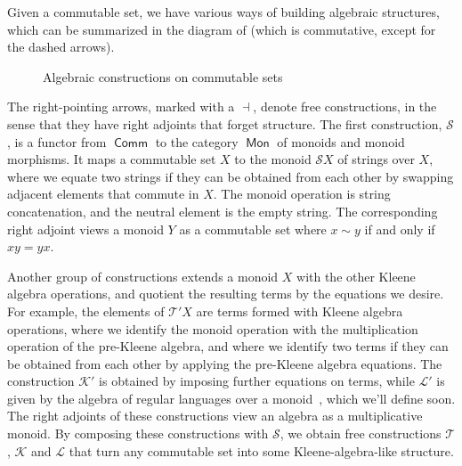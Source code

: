 \documentclass[a4paper,UKenglish,cleveref, autoref, thm-restate]{lipics-v2021}
\DeclareMathOperator{\Mon}{\mathsf{Mon}}
\DeclareMathOperator{\preKA}{\mathsf{preKA}}
\DeclareMathOperator{\KA}{\mathsf{KA}}
\DeclareMathOperator{\Comm}{\mathsf{Comm}}
\DeclareMathOperator{\Set}{\mathsf{Set}}
\begin{document}
Given a commutable set, we have various ways of building algebraic structures,
which can be summarized in the diagram of  (which is
commutative, except for the dashed arrows).
\begin{figure}
\begin{center}
\end{center}
\caption{Algebraic constructions on commutable sets}
\label{fig:comm-set-diagram}
\end{figure}
The right-pointing arrows, marked with a $ \dashv $, denote free constructions,
in the sense that they have right adjoints that forget structure.  The first
construction, $\mathcal{S}$, is a functor from $\Comm$ to the category $\Mon$ of
monoids and monoid morphisms.  It maps a commutable set $X$ to the monoid
$\mathcal{S}X$ of strings over $X$, where we equate two strings if they can be
obtained from each other by swapping adjacent elements that commute in $X$.  The
monoid operation is string concatenation, and the neutral element is the empty
string.  The corresponding right adjoint views a monoid $Y$ as a commutable set
where $x \sim y$ if and only if $xy = yx$.

Another group of constructions extends a monoid $X$ with the other Kleene
algebra operations, and quotient the resulting terms by the equations we desire.
For example, the elements of $\mathcal{T}'X$ are terms formed with Kleene
algebra operations, where we identify the monoid operation with the
multiplication operation of the pre-Kleene algebra, and where we identify two
terms if they can be obtained from each other by applying the pre-Kleene algebra
equations.  The construction $\mathcal{K}'$ is obtained by imposing further
equations on terms, while $\mathcal{L}'$ is given by the algebra of regular
languages over a monoid~\cite{DBLP:conf/lics/Kozen97}, which we'll define soon.
The right adjoints of these constructions view an algebra as a multiplicative
monoid.  By composing these constructions with $\mathcal{S}$, we obtain free
constructions $\mathcal{T}$, $\mathcal{K}$ and $\mathcal{L}$ that turn any
commutable set into some Kleene-algebra-like structure.
\end{document}
